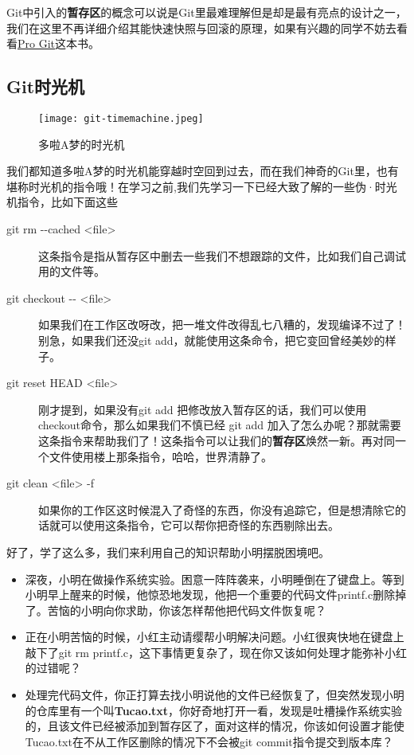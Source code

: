 Git中引入的\textbf{暂存区}的概念可以说是Git里最难理解但是却是最有亮点的设计之一，我们在这里不再详细介绍其能快速快照与回滚的原理，如果有兴趣的同学不妨去看看\href{http://download.csdn.net/detail/shuangde800/5977817}{Pro Git}这本书。

\subsection{Git时光机}

\begin{figure}[htbp]
	\centering
	\texttt{[image: git-timemachine.jpeg]}
	\caption{多啦A梦的时光机}
\end{figure}

我们都知道多啦A梦的时光机能穿越时空回到过去，而在我们神奇的Git里，也有堪称时光机的指令哦！在学习之前,我们先学习一下已经大致了解的一些伪·时光机指令，比如下面这些

\begin{description}
\item[git rm -{}-cached <file>] 这条指令是指从暂存区中删去一些我们不想跟踪的文件，比如我们自己调试用的文件等。
\item[git checkout -{}- <file>] 如果我们在工作区改呀改，把一堆文件改得乱七八糟的，发现编译不过了！别急，如果我们还没git add，就能使用这条命令，把它变回曾经美妙的样子。
\item[git reset HEAD <file>] 刚才提到，如果没有git add 把修改放入暂存区的话，我们可以使用checkout命令，那么如果我们不慎已经 git add 加入了怎么办呢？那就需要这条指令来帮助我们了！这条指令可以让我们的\textbf{暂存区}焕然一新。再对同一个文件使用楼上那条指令，哈哈，世界清静了。
\item[git clean <file> -f] 如果你的工作区这时候混入了奇怪的东西，你没有追踪它，但是想清除它的话就可以使用这条指令，它可以帮你把奇怪的东西剔除出去。
\end{description}

好了，学了这么多，我们来利用自己的知识帮助小明摆脱困境吧。

\begin{thinking}\label{think-小明的困境}
	\begin{itemize}
	  \item 深夜，小明在做操作系统实验。困意一阵阵袭来，小明睡倒在了键盘上。等到小明早上醒来的时候，他惊恐地发现，他把一个重要的代码文件printf.c删除掉了。苦恼的小明向你求助，你该怎样帮他把代码文件恢复呢？
		\item 正在小明苦恼的时候，小红主动请缨帮小明解决问题。小红很爽快地在键盘上敲下了git rm printf.c，这下事情更复杂了，现在你又该如何处理才能弥补小红的过错呢？
		\item 处理完代码文件，你正打算去找小明说他的文件已经恢复了，但突然发现小明的仓库里有一个叫\textbf{Tucao.txt}，你好奇地打开一看，发现是吐槽操作系统实验的，且该文件已经被添加到暂存区了，面对这样的情况，你该如何设置才能使Tucao.txt在不从工作区删除的情况下不会被git commit指令提交到版本库？
	\end{itemize}
\end{thinking}


